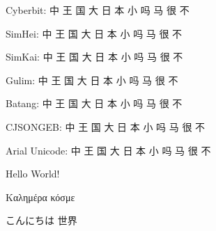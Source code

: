 \documentclass[twocolumn]{article}
\begin{document}
\begin{CJK*}{UTF8}{Cyberbit} \CJKtilde
Cyberbit: 中 王 国 大 日 本 小 吗 马 很 不
\end{CJK*}

\begin{CJK*}{UTF8}{simhei} \CJKtilde
SimHei: 中 王 国 大 日 本 小 吗 马 很 不
\end{CJK*}

\begin{CJK*}{UTF8}{SIMKAI} \CJKtilde
SimKai: 中 王 国 大 日 本 小 吗 马 很 不
\end{CJK*}

\begin{CJK*}{UTF8}{gulim} \CJKtilde
Gulim: 中 王 国 大 日 本 小 吗 马 很 不
\end{CJK*}

\begin{CJK*}{UTF8}{batang} \CJKtilde
Batang: 中 王 国 大 日 本 小 吗 马 很 不
\end{CJK*}

\begin{CJK*}{UTF8}{CJSONGEB} \CJKtilde
CJSONGEB: 中 王 国 大 日 本 小 吗 马 很 不
\end{CJK*}

\begin{CJK*}{UTF8}{ARIALUNI} \CJKtilde
Arial Unicode: 中 王 国 大 日 本 小 吗 马 很 不
\end{CJK*}


\begin{CJK}{UTF8}{ARIALUNI}

\noindent Hello World!

\noindent Καλημέρα κόσμε

\CJKnospace
\noindent こんにちは 世界

\end{CJK} 
\end{document}
